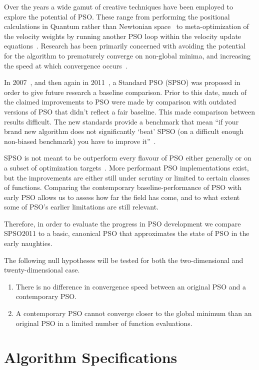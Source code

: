 \documentclass{csfourzero}
\begin{document}
Over the years a wide gamut of creative techniques have been employed to
explore the potential of PSO\@. These range from performing the positional
calculations in Quantum rather than Newtonian space~\cite{Sun:2004kc} to
meta-optimization of the velocity weights by running another PSO loop within
the velocity update equations~\cite{Schoene:2012ir}. Research has been
primarily concerned with avoiding the potential for the algorithm to
prematurely converge on non-global minima, and increasing the speed at which
convergence occurs~\cite{vandenBergh:2002tk}.

In 2007~\cite{Bratton:2007hq}, and then again in 2011~\cite{Clerc:2012to}, a
Standard PSO (SPSO) was proposed in order to give future research a baseline
comparison. Prior to this date, much of the claimed improvements to PSO were
made by comparison with outdated versions of PSO that didn't reflect a fair
baseline. This made comparison between results difficult. The new standards
provide a benchmark that mean  ``if your brand new algorithm does not
significantly `beat' SPSO (on a difficult enough non-biased benchmark) you have
to improve it''~\cite{Clerc:2012to}.

SPSO is not meant to be outperform every flavour of PSO either generally or on
a subset of optimization targets~\cite{Bratton:2007hq}. More performant PSO
implementations exist, but the improvements are either still under scrutiny or
limited to certain classes of functions. Comparing the contemporary
baseline-performance of PSO with early PSO allows us to assess how far the
field has come, and to what extent some of PSO's earlier limitations are still
relevant.

Therefore, in order to evaluate the progress in PSO development we compare
SPSO2011 to a basic, canonical PSO that approximates the state of PSO in the
early naughties.

The following null hypotheses will be tested for both the two-dimensional and
twenty-dimensional case.

\begin{enumerate}
  \item{There is no difference in convergence speed between an original PSO
      and a contemporary PSO.}
  \item{A contemporary PSO cannot converge closer to the global minimum
      than an original PSO in a limited number of function evaluations.}
\end{enumerate}

\section{Algorithm Specifications}
\end{document}
